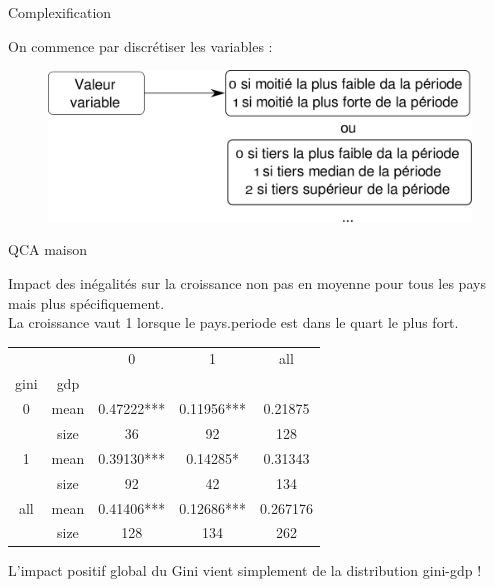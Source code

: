 \documentclass[xcolor=x11names,french]{beamer}
\renewcommand{\(}{\begin{columns}}
\renewcommand{\)}{\end{columns}}
\newcommand{\<}[1]{\begin{column}{#1}}
\renewcommand{\>}{\end{column}}
\begin{document}
\begin{frame}{Complexification}

On commence par discrétiser les variables : 

\begin{figure}
\includegraphics[scale=0.3]{quartilize}
\end{figure}


\end{frame}


\begin{frame}{QCA maison}

Impact des inégalités sur la croissance non pas en moyenne pour tous les pays mais plus spécifiquement.   \\
La croissance vaut 1 lorsque le pays.periode est dans le quart le plus fort. 
\bigskip

\begin{tabular}{c | c | c  c  c  }
     &        &       0     &      1    &   all \\
gini & gdp    &            &           &           \\
  \hline			
0  &  mean &  0.47222*** & 0.11956*** &  0.21875 \\
    & size  &        36   &       92   &    128 \\
1  &  mean & 0.39130***  &  0.14285* &  0.31343 \\
   &  size     &     92      &    42     &  134 \\
all & mean & 0.41406*** & 0.12686*** & 0.267176  \\
   &  size     &    128   &      134     &  262 \\
\end{tabular}

\bigskip

L'impact positif global du Gini vient simplement de la distribution gini-gdp ! 


\end{frame}
\end{document}
